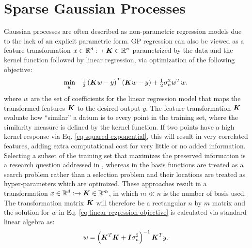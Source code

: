 \documentclass[useAMS,usenatbib,fleqn]{mn2e}
\begin{document}
\section{Sparse Gaussian Processes}
\label{sec-sparse-gaussian-processes}
Gaussian processes are often described as non-parametric regression models due to the lack of an explicit parametric form. GP regression can also be viewed as a feature transformation $x\in \mathbb{R}^{d}:\rightarrow \bmath{K}\in \mathbb{R}^{n}$ parametrized by the data and the kernel function followed by linear regression, via optimization of the following objective:
\begin{equation}
\label{eq-linear-regression-objective}
\begin{array}{lcl}
\underset{w}{\text{min}} &\frac{1}{2}\left ( \bmath{K}w-y \right )^{T}\left( \bmath{K}w-y \right )+\frac{1}{2}\sigma_{n}^{2}w^{T}w.
\end{array}
\end{equation}
where $w$ are the set of coefficients for the linear regression model that maps the transformed features $\bmath{K}$ to the desired output $y$. The feature transformation $\bmath{K}$ evaluate how ``similar'' a datum is to every point in the training set, where the similarity measure is defined by the kernel function. If two points have a high kernel response via  Eq. \eqref{eq-squared-exponential}, this will result in very correlated features, adding extra computational cost for very little or no added information. Selecting a subset of the training set that maximizes the preserved information is a research question addressed in \citep{foster2009}, whereas in \citep{snelson2005} the basis functions are treated as a search problem rather than a selection problem and their locations are treated as hyper-parameters which are optimized. These approaches result in a transformation $x\in \mathbb{R}^{d}:\rightarrow \bmath{K}\in \mathbb{R}^{m}$, in which $m\ll n$ is the number of basis used. The transformation matrix $\bmath{K}$ will therefore be a rectangular $n$ by $m$ matrix and the solution for $w$ in  Eq. \eqref{eq-linear-regression-objective} is calculated via standard linear algebra as:
\begin{equation}
\label{eq-linear-regression-objective-rectangular}
w = \left(\bmath{K}^{T}\bmath{K}+\bmath{I}\sigma_{n}^{2} \right)^{-1}\bmath{K}^{T}y.
\end{equation}
\end{document}
